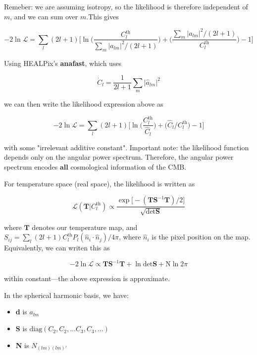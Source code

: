 \documentclass[a4paper, 11pt]{article}
\begin{document}
Remeber: we are assuming isotropy, so the likelihood is therefore independent of $m$, and we can sum over $m$.This gives 

\begin{equation}
-2\ln\mathcal{L} = \sum_{l}(2l+1)\Big[\ln\Big(\frac{C^{\text{th}}_l}{\sum_{m}\vert a_{lm}\vert^2/(2l+1)}\Big)+\Big(\frac{\sum_{m}\vert a_{lm}\vert^2/(2l+1)}{C^{\text{th}}_l}\Big)-1 \Big]
\end{equation}

Using HEALPix's \textbf{anafast}, which uses 

\begin{equation}
\dot{C}_l=\frac{1}{2l+1}\sum_m \vert\hat{a}_{lm}\vert^2
\end{equation}

we can then write the likelihood expression above as 

\begin{equation}
-2\ln\mathcal{L} = \sum_{l}(2l+1)\Big[\ln\Big( \frac{C^{\text{th}}_l}{\hat{C}_l}\Big) +\Big(\hat{C}_l/C^{\text{th}}_l\Big)-1 \Big]
\end{equation}

with some "irrelevant additive constant". Important note: the likelihood function depends only on the angular power spectrum. Therefore, the angular power spectrum encodes $\textbf{all}$ cosmological information of the CMB.

For temperature space (real space), the likelihood is written as 

\begin{equation}
\mathcal{L}(\textbf{T}\vert C^{\text{th}}_l)\propto \frac{\exp\big[-(\textbf{T}\textbf{S}^{-1}\textbf{T})/2\big]}{\sqrt{\text{det}\textbf{S}}}
\end{equation}

where $\textbf{T}$ denotes our temperature map, and $S_{ij}=\sum_l(2l+1)C^{\text{th}}_l P_l(\hat{n}_i\cdot\hat{n}_j)/4\pi$, where $\hat{n}_i$ is the pixel position on the map. Equivalently, we can writen this as

\begin{equation}
-2 \ln\mathcal{L}\propto\textbf{T}\textbf{S}^{-1}\textbf{T}+\ln\text{det}\textbf{S}+\text{N}\ln2\pi
\end{equation}

within constant---the above expression is approximate. 

In the spherical harmonic basis, we have: 
\begin{itemize}
\item[]\textbf{d} is $a_{lm}$
\item[]\textbf{S} is $\text{diag}(C_2, C_2,\dots C_3, C_3, \dots)$
\item[]\textbf{N} is $N_{(lm)(lm)'}$
\end{itemize}
\end{document}
